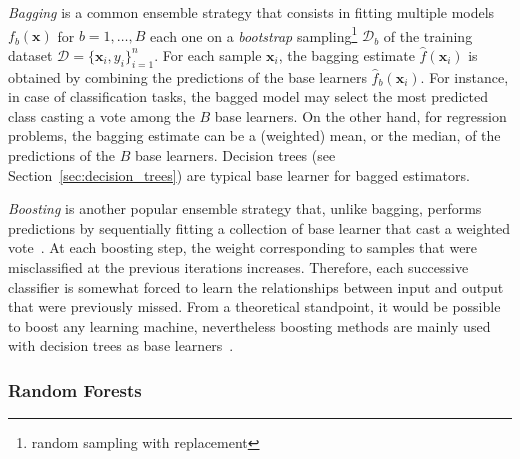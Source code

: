 	    \textit{Bagging} is a common ensemble strategy that consists in fitting multiple models $f_b(\bm{x})$ for $b=1,\dots,B$ each one on a \textit{bootstrap} sampling\footnote{random sampling with replacement} $\mathcal{D}_b$ of the training dataset  $\mathcal{D}=\{\bm{x}_i, y_i\}_{i=1}^n$.
	    For each sample $\bm{x}_i$, the bagging estimate $\hat{f}(\bm{x}_i)$ is obtained by combining the predictions of the base learners $\hat{f}_b(\bm{x}_i)$. For instance, in case of classification tasks, the bagged model may select the most predicted class casting a vote among the $B$ base learners. On the other hand, for regression problems, the bagging estimate can be a (weighted) mean, or the median, of the predictions of the $B$ base learners. Decision trees (see Section~\ref{sec:decision_trees}) are typical base learner for bagged estimators.

	    \textit{Boosting} is another popular ensemble strategy that, unlike bagging, performs predictions by sequentially fitting a collection of base learner that cast a weighted vote~\citep{hastie2009elements}. At each boosting step, the weight corresponding to samples that were misclassified at the previous iterations increases. Therefore, each successive classifier is somewhat forced to learn the relationships between input and output that were previously missed. From a theoretical standpoint, it would be possible to boost any learning machine, nevertheless boosting methods are mainly used with decision trees as base learners~\cite{hastie2009elements}.

	    \subsubsection{Random Forests} \label{sec:random_forests}

